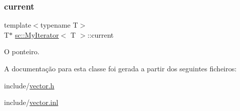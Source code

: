 \subsubsection{\texorpdfstring{current}{current}}
{\footnotesize\ttfamily template$<$typename T$>$ \\
T$\ast$ \hyperlink{classsc_1_1MyIterator}{sc\+::\+My\+Iterator}$<$ T $>$\+::current\hspace{0.3cm}{\ttfamily [private]}}



O ponteiro. 



A documentação para esta classe foi gerada a partir dos seguintes ficheiros\+:\begin{DoxyCompactItemize}
\item 
include/\hyperlink{vector_8h}{vector.\+h}\item 
include/\hyperlink{vector_8inl}{vector.\+inl}\end{DoxyCompactItemize}
